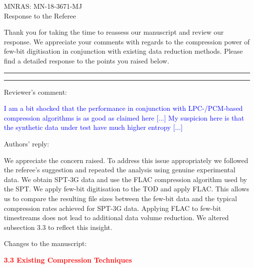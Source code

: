 \documentclass{article}
\newcommand{\changed}[1]{\textcolor{Red}{#1}}
\newcommand{\question}[1]{\textcolor{Blue}{#1}}
\newlength\tindent
\renewcommand{\indent}{\hspace*{\tindent}}
\begin{document}


\begin{center}
\Large MNRAS: MN-18-3671-MJ\\Response to the Referee
\end{center}

Thank you for taking the time to reassess our manuscript and review our response. We appreciate your comments with regards to the compression power of few-bit digitisation in conjunction with existing data reduction methods. Please find a detailed response to the points you raised below.

\vspace{0.5cm}

\hrule
\vspace{0.1cm}
\hrule

\vspace{0.5cm}

Reviewer's comment:

\indent \question{I am a bit shocked that the performance in conjunction with LPC-/PCM-based compression algorithms is as good as claimed here [...] My suspicion here is that the synthetic data under test have much higher entropy [...]}

\vspace{0.25cm}

Authors' reply:

\indent We appreciate the concern raised. To address this issue appropriately we followed the referee's suggestion and repeated the analysis using genuine experimental data.
We obtain SPT-3G data and use the FLAC compression algorithm used by the SPT. We apply few-bit digitisation to the TOD and apply FLAC. This allows us to compare the resulting file sizes between the few-bit data and the typical compression rates achieved for SPT-3G data.
Applying FLAC to few-bit timestreams does not lead to additional data volume reduction. We altered subsection 3.3 to reflect this insight.

\vspace{0.25cm}

Changes to the manuscript:

\indent \textbf{\changed{3.3 Existing Compression Techniques}}
\end{document}
